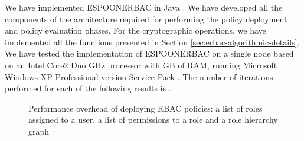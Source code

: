 \documentclass[epsfig,a4paper,11pt,titlepage]{book}
\numberwithin{algorithm}{chapter}
\begin{document}
We have implemented \gls{ESPOONERBAC} in Java . We have developed all the components of the architecture required for performing the policy deployment and policy evaluation phases. For the cryptographic operations, we have implemented all the functions presented in Section \ref{sec:erbac-algorithmic-details}. We have tested the implementation of \gls{ESPOONERBAC} on a single node based on an Intel Core2 Duo  GHz processor with  GB of RAM, running Microsoft Windows XP Professional version  Service Pack . The number of iterations performed for each of the following results is .

\begin{figure} [htp]
\centering
{}
\caption[Performance overhead of deploying RBAC policies]{Performance overhead of deploying \gls{RBAC} policies:  a list of roles assigned to a user,  a list of permissions to a role and  a role hierarchy graph}
\label{fig:erbac-policy-deployment-rbac-policy}
\end{figure}
\end{document}
